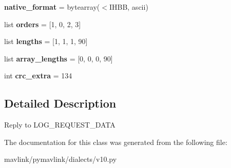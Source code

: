 \begin{DoxyCompactItemize}
{\bfseries native\+\_\+format} = bytearray(\textquotesingle{}$<$I\+H\+BB\textquotesingle{}, \textquotesingle{}ascii\textquotesingle{})
\item 
\mbox{\label{classpymavlink_1_1dialects_1_1v10_1_1MAVLink__log__data__message_a89f822113d3c29b53fd6b6aa01539a5b}} 
list {\bfseries orders} = \mbox{[}1, 0, 2, 3\mbox{]}
\item 
\mbox{\label{classpymavlink_1_1dialects_1_1v10_1_1MAVLink__log__data__message_a08c6b286f30177dc1212bb6e14128e81}} 
list {\bfseries lengths} = \mbox{[}1, 1, 1, 90\mbox{]}
\item 
\mbox{\label{classpymavlink_1_1dialects_1_1v10_1_1MAVLink__log__data__message_acb9d0a8f0c991a2fac98d10abbbee454}} 
list {\bfseries array\+\_\+lengths} = \mbox{[}0, 0, 0, 90\mbox{]}
\item 
\mbox{\label{classpymavlink_1_1dialects_1_1v10_1_1MAVLink__log__data__message_a71ee8cedc5c85098513e6034b4537e71}} 
int {\bfseries crc\+\_\+extra} = 134
\end{DoxyCompactItemize}


\subsection{Detailed Description}
\begin{DoxyVerb}Reply to LOG_REQUEST_DATA
\end{DoxyVerb}
 

The documentation for this class was generated from the following file\+:\begin{DoxyCompactItemize}
\item 
mavlink/pymavlink/dialects/v10.\+py\end{DoxyCompactItemize}
